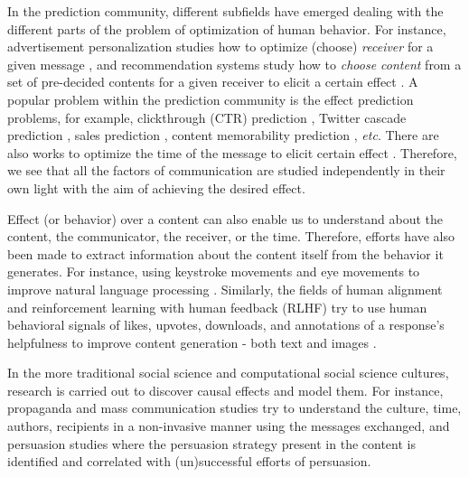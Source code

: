 \documentclass[hidelinks,11pt,a4paper]{report}
\renewcommand{\cite}[1]{\citep{#1}}
\begin{document}
In the prediction community, different subfields have emerged dealing with the different parts of the problem of optimization of human behavior. For instance, advertisement personalization studies how to optimize (choose) \textit{receiver} for a given message \cite{chandra2022personalization}, and recommendation systems study how to \textit{choose content} from a set of pre-decided contents for a given receiver to elicit a certain effect \cite{herlocker2004evaluating}. A popular problem within the prediction community is the effect prediction problems, for example, clickthrough (CTR) prediction \cite{mcmahan2013ad}, Twitter cascade prediction \cite{cheng2014can,martin2016exploring}, sales prediction \cite{choi2012predicting,pryzant2017predicting}, content memorability prediction \cite{isola2011makes,khosla2015understanding,si2023long}, \textit{etc}. There are also works to optimize the time of the message to elicit certain effect \cite{newstead2010cost,si2023long}. Therefore, we see that all the factors of communication are studied independently in their own light with the aim of achieving the desired effect. 


Effect (or behavior) over a content can also enable us to understand about the content, the communicator, the receiver, or the time. Therefore, efforts have also been made to extract information about the content itself from the behavior it generates. For instance, using keystroke movements \cite{plank2016keystroke} and eye movements to improve natural language processing \cite{klerke2016improving,khurana-etal-2023-synthesizing}. Similarly, the fields of human alignment and reinforcement learning with human feedback (RLHF) try to use human behavioral signals of likes, upvotes, downloads, and annotations of a response's helpfulness to improve content generation - both text \cite{kreutzer2018can,stiennon2020learning,ziegler2019fine,nakano2021webgpt,si2023long} and images \cite{lee2023aligning,pressman2023simulacra,wu2023better,khurana2023behavior}.




In the more traditional social science and computational social science cultures, research is carried out to discover causal effects and model them. 
For instance, propaganda and mass communication studies \cite{mcquail1987mass,krippendorff2018content,lasswell1948structure,lasswell1971propaganda} try to understand the culture, time, authors, recipients in a non-invasive manner using the messages exchanged, and persuasion studies \cite{petty1981effects,chaiken1980heuristic} where the persuasion strategy present in the content is identified and correlated with (un)successful efforts of persuasion. 
\end{document}
